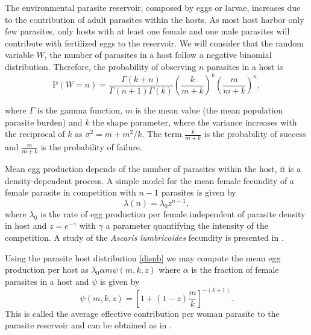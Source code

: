 \documentclass[eng]{MMSB-class-eng}
\begin{document}
The environmental parasite reservoir, composed by eggs or larvae, increases due to the contribution of adult parasites within the hosts. As most host harbor only few parasites, only hosts with at least one female and one male parasites will contribute with fertilized eggs to the reservoir. We will consider that the random variable $W$, the number of parasites in a host follow a negative binomial distribution. 
Therefore, the probability of observing $n$ parasites in a host is
\begin{equation}\label{disnb}
\mathrm{P}(W=n)=\frac{\Gamma(k+n)}{\Gamma(n+1)\Gamma(k)}\left( \frac{k}{m+k}\right) ^{k} \left( \frac{m}{m+k}\right) ^n,
\end{equation}
{\color{red}
where $\Gamma$ is the gamma function,  
$m$ is the mean value (the mean population parasite burden) and $k$ the shape parameter, where the variance increases with the reciprocal of $k$ as $\sigma^2=m+m^2/k$. 
The term $\frac{k}{m+k}$ is the probability of success and $ \frac{m}{m+k}$ is the  probability of failure.



Mean egg production depends of the number of parasites within the host, it is a density-dependent process. 
A simple model for the mean female fecundity of a female parasite in competition with $n-1$ parasites is given by 
\begin{equation}
\lambda(n)=\lambda_0 z^{n-1},
\end{equation}
where $\lambda_0$ is the rate of egg production per female independent of parasite density in host and $z=e^{-\gamma}$ with $\gamma$ a parameter quantifying the intensity of the competition. A study of the \textit{Ascaris lumbricoides} fecundity is presented in \citet{hall2000geographical}. 


Using the parasite host distribution \eqref{disnb} we may compute the mean egg production per host as \citep{lopez2022general}
$\lambda_0
\alpha m
\psi(m,k,z)$
where $\alpha$  is the fraction of female parasites in a host and $\psi$ is given by
\begin{equation}\label{psi}
\psi(m,k,z)=\left[ 1+(1-z)\dfrac{m}{k}\right]^{-(k+1)}.
\end{equation}
This is called the average effective contribution per woman parasite to the parasite reservoir %
and can be obtained as in \cite{churcher2006density,lopez2022general}.
}
\end{document}
